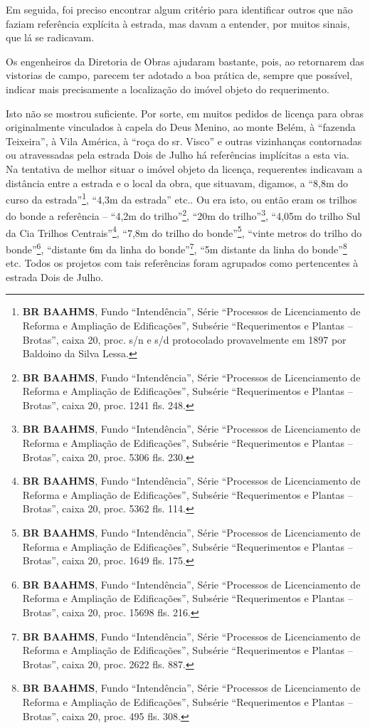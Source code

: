Em seguida, foi preciso encontrar algum critério para identificar outros que não faziam referência explícita à estrada, mas davam a entender, por muitos sinais, que lá se radicavam. 

Os engenheiros da Diretoria de Obras ajudaram bastante, pois, ao retornarem das vistorias de campo, parecem ter adotado a boa prática de, sempre que possível, indicar mais precisamente a localização do imóvel objeto do requerimento. 

Isto não se mostrou suficiente. Por sorte, em muitos pedidos de licença para obras originalmente vinculados à capela do Deus Menino, ao monte Belém, à ``fazenda Teixeira'', à Vila América, à ``roça do sr. Visco'' e outras vizinhanças contornadas ou atravessadas pela estrada Dois de Julho há referências implícitas a esta via. Na tentativa de melhor situar o imóvel objeto da licença, requerentes indicavam a distância entre a estrada e o local da obra, que situavam, digamos, a ``8,8m do curso da estrada''\footnote{\textbf{BR BAAHMS}, Fundo ``Intendência'', Série ``Processos de Licenciamento de Reforma e Ampliação de Edificações'', Subsérie ``Requerimentos e Plantas -- Brotas'', caixa 20, proc. s/n e s/d protocolado provavelmente em 1897 por Baldoino da Silva Lessa.}, ``4,3m da estrada'' etc.. Ou era isto, ou então eram os trilhos do bonde a referência -- ``4,2m do trilho''\footnote{\textbf{BR BAAHMS}, Fundo ``Intendência'', Série ``Processos de Licenciamento de Reforma e Ampliação de Edificações'', Subsérie ``Requerimentos e Plantas -- Brotas'', caixa 20, proc. 1241 fls. 248.}, ``20m do trilho''\footnote{\textbf{BR BAAHMS}, Fundo ``Intendência'', Série ``Processos de Licenciamento de Reforma e Ampliação de Edificações'', Subsérie ``Requerimentos e Plantas -- Brotas'', caixa 20, proc. 5306 fls. 230.}, ``4,05m do trilho Sul da Cia Trilhos Centrais''\footnote{\textbf{BR BAAHMS}, Fundo ``Intendência'', Série ``Processos de Licenciamento de Reforma e Ampliação de Edificações'', Subsérie ``Requerimentos e Plantas -- Brotas'', caixa 20, proc. 5362 fls. 114.}, ``7,8m do trilho do bonde''\footnote{\textbf{BR BAAHMS}, Fundo ``Intendência'', Série ``Processos de Licenciamento de Reforma e Ampliação de Edificações'', Subsérie ``Requerimentos e Plantas -- Brotas'', caixa 20, proc. 1649 fls. 175.}, ``vinte metros do trilho do bonde''\footnote{\textbf{BR BAAHMS}, Fundo ``Intendência'', Série ``Processos de Licenciamento de Reforma e Ampliação de Edificações'', Subsérie ``Requerimentos e Plantas -- Brotas'', caixa 20, proc. 15698 fls. 216.}, ``distante 6m da linha do bonde''\footnote{\textbf{BR BAAHMS}, Fundo ``Intendência'', Série ``Processos de Licenciamento de Reforma e Ampliação de Edificações'', Subsérie ``Requerimentos e Plantas -- Brotas'', caixa 20, proc. 2622 fls. 887.}, ``5m distante da linha do bonde''\footnote{\textbf{BR BAAHMS}, Fundo ``Intendência'', Série ``Processos de Licenciamento de Reforma e Ampliação de Edificações'', Subsérie ``Requerimentos e Plantas -- Brotas'', caixa 20, proc. 495 fls. 308.} etc. Todos os projetos com tais referências foram agrupados como pertencentes à estrada Dois de Julho. 

